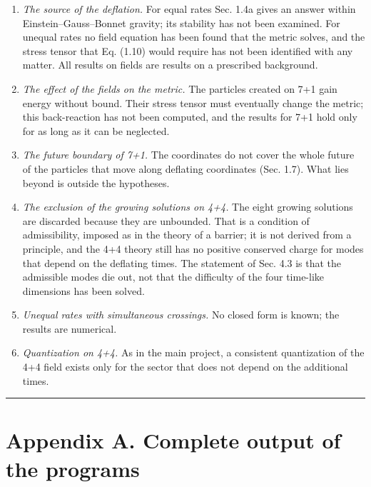 \documentclass[
  10pt,
]{article}
\providecommand{\tightlist}{%
  \setlength{\itemsep}{0pt}\setlength{\parskip}{0pt}}
\begin{document}
\begin{enumerate}
\def\labelenumi{\arabic{enumi}.}
\tightlist
\item
  \emph{The source of the deflation.} For equal rates Sec. 1.4a gives an
  answer within Einstein--Gauss--Bonnet gravity; its stability has not
  been examined. For unequal rates no field equation has been found that
  the metric solves, and the stress tensor that Eq. (1.10) would require
  has not been identified with any matter. All results on fields are
  results on a prescribed background.
\item
  \emph{The effect of the fields on the metric.} The particles created
  on 7+1 gain energy without bound. Their stress tensor must eventually
  change the metric; this back-reaction has not been computed, and the
  results for 7+1 hold only for as long as it can be neglected.
\item
  \emph{The future boundary of 7+1.} The coordinates do not cover the
  whole future of the particles that move along deflating coordinates
  (Sec. 1.7). What lies beyond is outside the hypotheses.
\item
  \emph{The exclusion of the growing solutions on 4+4.} The eight
  growing solutions are discarded because they are unbounded. That is a
  condition of admissibility, imposed as in the theory of a barrier; it
  is not derived from a principle, and the 4+4 theory still has no
  positive conserved charge for modes that depend on the deflating
  times. The statement of Sec. 4.3 is that the admissible modes die out,
  not that the difficulty of the four time-like dimensions has been
  solved.
\item
  \emph{Unequal rates with simultaneous crossings.} No closed form is
  known; the results are numerical.
\item
  \emph{Quantization on 4+4.} As in the main project, a consistent
  quantization of the 4+4 field exists only for the sector that does not
  depend on the additional times.
\end{enumerate}

\begin{center}\rule{0.5\linewidth}{0.5pt}\end{center}

\hypertarget{appendix-a.-complete-output-of-the-programs}{%
\section{Appendix A. Complete output of the
programs}\label{appendix-a.-complete-output-of-the-programs}}
\end{document}
